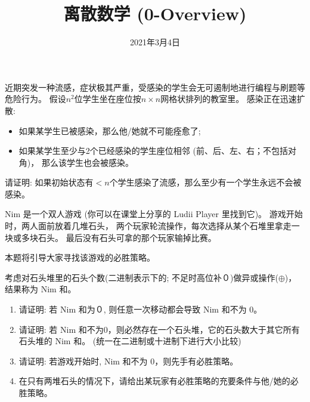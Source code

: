 \documentclass[a4paper, justified]{tufte-handout}
\title{离散数学 (0-Overview)}
\date{2021年3月4日}
\begin{document}
\maketitle
\noplagiarism %
\begin{abstract}
\end{abstract}
\beginrequired
\begin{problem}
  近期突发一种流感，症状极其严重，受感染的学生会无可遏制地进行编程与刷题等危险行为。
  假设$n^2$位学生坐在座位按$n \times n$网格状排列的教室里。
  感染正在迅速扩散:
  \begin{itemize}
    \item 如果某学生已被感染，那么他/她就不可能痊愈了;
    \item 如果某学生至少与2个已经感染的学生座位相邻 (前、后、左、右；不包括对角)，
      那么该学生也会被感染。
  \end{itemize}
  请证明: 如果初始状态有$< n$个学生感染了流感，那么至少有一个学生永远不会被感染。
\end{problem}

\begin{solution}
\end{solution}

\begin{problem}[Nim Game \score{6 = 1 + 2 + 2 + 1}]
  Nim 是一个双人游戏 (你可以在课堂上分享的 Ludii Player 里找到它)。
  游戏开始时，两人面前放着几堆石头，
  两个玩家轮流操作，每次选择从某个石堆里拿走一块或多块石头。
  最后没有石头可拿的那个玩家输掉比赛。


  本题将引导大家寻找该游戏的必胜策略。

  考虑对石头堆里的石头个数(二进制表示下的; 不足时高位补０)做异或操作($\oplus$)，
  结果称为 Nim 和。

  \begin{enumerate}[(1)]
    \item 请证明: 若 Nim 和为０, 则任意一次移动都会导致 Nim 和不为 0。
    \item 请证明: 若 Nim 和不为0，则必然存在一个石头堆，它的石头数大于其它所有石头堆的 Nim 和。
      (统一在二进制或十进制下进行大小比较)
    \item 请证明: 若游戏开始时, Nim 和不为 0，则先手有必胜策略。
    \item 在只有两堆石头的情况下，请给出某玩家有必胜策略的充要条件与他/她的必胜策略。
  \end{enumerate}
\end{problem}
\end{document}
